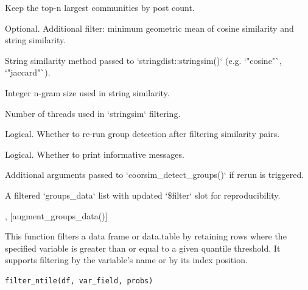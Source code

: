 \documentclass[a4paper]{book}
\begin{document}
\begin{Arguments}
\begin{ldescription}
\item[\code{top\_n\_postwise}] Keep the top-n largest communities by post count.

\item[\code{stringsimil\_cutoff}] Optional. Additional filter: minimum geometric mean of cosine similarity and string similarity.

\item[\code{stringsimil\_method}] String similarity method passed to `stringdist::stringsim()` (e.g. `"cosine"`, `"jaccard"`).

\item[\code{stringsimil\_ngram}] Integer n-gram size used in string similarity.

\item[\code{nthread}] Number of threads used in `stringsim` filtering.

\item[\code{rerun\_detect\_groups}] Logical. Whether to re-run group detection after filtering similarity pairs.

\item[\code{verbose}] Logical. Whether to print informative messages.

\item[\code{...}] Additional arguments passed to `coorsim\_detect\_groups()` if rerun is triggered.
\end{ldescription}
\end{Arguments}
%
\begin{Value}
A filtered `groups\_data` list with updated `\$filter` slot for reproducibility.
\end{Value}
%
\begin{SeeAlso}
, [augment\_groups\_data()]
\end{SeeAlso}
%
\begin{Description}
This function filters a data frame or data.table by retaining rows where the specified variable is 
greater than or equal to a given quantile threshold. It supports filtering by the variable's name 
or by its index position.
\end{Description}
%
\begin{Usage}
\begin{verbatim}
filter_ntile(df, var_field, probs)
\end{verbatim}
\end{Usage}
%
\end{document}
